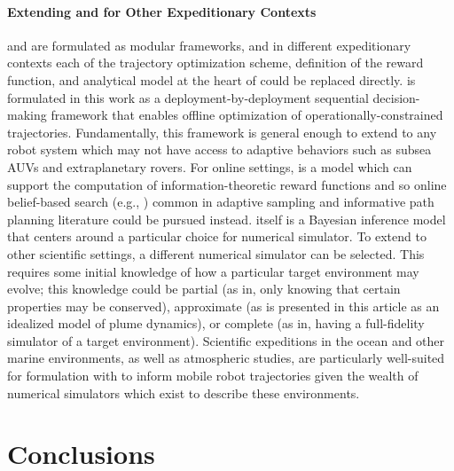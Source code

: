 \paragraph{Extending \PHORTEX and \PHUMES for Other Expeditionary Contexts}
\PHORTEX and \PHUMES are formulated as modular frameworks, and in different expeditionary contexts each of the trajectory optimization scheme, definition of the reward function, and analytical model at the heart of \PHUMES could be replaced directly. \PHORTEX is formulated in this work as a deployment-by-deployment sequential decision-making framework that enables offline optimization of operationally-constrained trajectories. Fundamentally, this framework is general enough to extend to any robot system which may not have access to adaptive behaviors such as subsea AUVs and extraplanetary rovers. For online settings, \PHUMES is a model which can support the computation of information-theoretic reward functions and so online belief-based search (e.g., \autocite{flaspohler2019information, Arora2017, Sun2017, sunberg2018online}) common in adaptive sampling and informative path planning literature could be pursued instead. \PHUMES itself is a Bayesian inference model that centers around a particular choice for numerical simulator. To extend to other scientific settings, a different numerical simulator can be selected. This requires some initial knowledge of how a particular target environment may evolve; this knowledge could be partial (as in, only knowing that certain properties may be conserved), approximate (as is presented in this article as an idealized model of plume dynamics), or complete (as in, having a full-fidelity simulator of a target environment). Scientific expeditions in the ocean and other marine environments, as well as atmospheric studies, are particularly well-suited for formulation with \PHUMES to inform mobile robot trajectories given the wealth of numerical simulators which exist to describe these environments. 
\section{Conclusions}